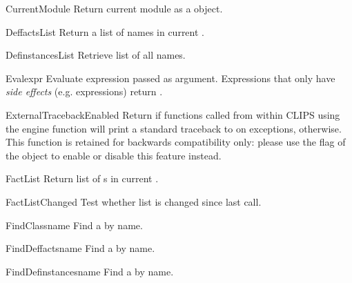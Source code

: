 \begin{funcdesc}{CurrentModule}{}
Return current module as a  object.
\end{funcdesc}

\begin{funcdesc}{DeffactsList}{}
Return a list of  names in current .
\end{funcdesc}

\begin{funcdesc}{DefinstancesList}{}
Retrieve list of all  names.
\end{funcdesc}

\begin{funcdesc}{Eval}{expr}
Evaluate expression passed as argument. Expressions that only have
\emph{side effects} (e.g.  expressions) return
.
\end{funcdesc}

\begin{funcdesc}{ExternalTracebackEnabled}{}
Return  if functions called from within CLIPS using the
engine function  will print a standard traceback to
 on exceptions,  otherwise. This function
is retained for backwards compatibility only: please use the
 flag of the  object to enable or
disable this feature instead.
\end{funcdesc}

\begin{funcdesc}{FactList}{}
Return list of s in current .
\end{funcdesc}

\begin{funcdesc}{FactListChanged}{}
Test whether  list is changed since last call.
\end{funcdesc}

\begin{funcdesc}{FindClass}{name}
Find a  by name.
\end{funcdesc}

\begin{funcdesc}{FindDeffacts}{name}
Find a  by name.
\end{funcdesc}

\begin{funcdesc}{FindDefinstances}{name}
Find a  by name.
\end{funcdesc}

